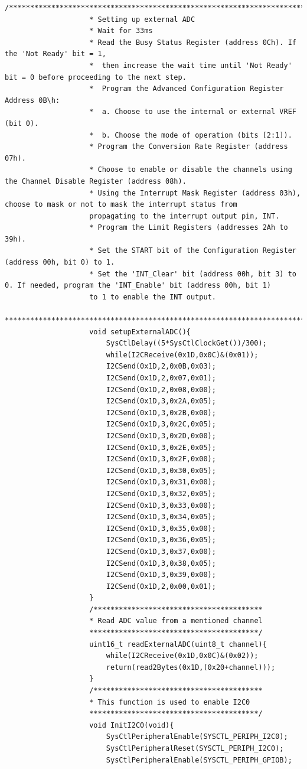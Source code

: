 \documentclass[a4paper,10pt,oneside]{article}
\begin{document}
\begin{lstlisting}[style=CStyle]
					/*********************************************************************************************
					* Setting up external ADC
					* Wait for 33ms
					* Read the Busy Status Register (address 0Ch). If the 'Not Ready' bit = 1,
					*  then increase the wait time until 'Not Ready' bit = 0 before proceeding to the next step.
					*  Program the Advanced Configuration Register  Address 0B\h:
					*  a. Choose to use the internal or external VREF (bit 0).
					*  b. Choose the mode of operation (bits [2:1]).
					* Program the Conversion Rate Register (address 07h).
					* Choose to enable or disable the channels using the Channel Disable Register (address 08h).
					* Using the Interrupt Mask Register (address 03h), choose to mask or not to mask the interrupt status from
					propagating to the interrupt output pin, INT.
					* Program the Limit Registers (addresses 2Ah to 39h).
					* Set the START bit of the Configuration Register (address 00h, bit 0) to 1.
					* Set the 'INT_Clear' bit (address 00h, bit 3) to 0. If needed, program the 'INT_Enable' bit (address 00h, bit 1)
					to 1 to enable the INT output.
					*********************************************************************************************/
					void setupExternalADC(){
						SysCtlDelay((5*SysCtlClockGet())/300);
						while(I2CReceive(0x1D,0x0C)&(0x01));
						I2CSend(0x1D,2,0x0B,0x03);
						I2CSend(0x1D,2,0x07,0x01);
						I2CSend(0x1D,2,0x08,0x00);
						I2CSend(0x1D,3,0x2A,0x05);
						I2CSend(0x1D,3,0x2B,0x00);
						I2CSend(0x1D,3,0x2C,0x05);
						I2CSend(0x1D,3,0x2D,0x00);
						I2CSend(0x1D,3,0x2E,0x05);
						I2CSend(0x1D,3,0x2F,0x00);
						I2CSend(0x1D,3,0x30,0x05);
						I2CSend(0x1D,3,0x31,0x00);
						I2CSend(0x1D,3,0x32,0x05);
						I2CSend(0x1D,3,0x33,0x00);
						I2CSend(0x1D,3,0x34,0x05);
						I2CSend(0x1D,3,0x35,0x00);
						I2CSend(0x1D,3,0x36,0x05);
						I2CSend(0x1D,3,0x37,0x00);
						I2CSend(0x1D,3,0x38,0x05);
						I2CSend(0x1D,3,0x39,0x00);
						I2CSend(0x1D,2,0x00,0x01);
					}
					/****************************************
					* Read ADC value from a mentioned channel
					****************************************/
					uint16_t readExternalADC(uint8_t channel){
						while(I2CReceive(0x1D,0x0C)&(0x02));
						return(read2Bytes(0x1D,(0x20+channel)));
					}
					/****************************************
					* This function is used to enable I2C0
					****************************************/
					void InitI2C0(void){
						SysCtlPeripheralEnable(SYSCTL_PERIPH_I2C0);
						SysCtlPeripheralReset(SYSCTL_PERIPH_I2C0);
						SysCtlPeripheralEnable(SYSCTL_PERIPH_GPIOB);

\end{lstlisting}
\end{document}
